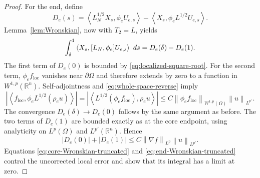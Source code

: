 \documentclass[10pt,a4paper]{amsart}
\newcommand\R{\mathbb{R}}
\newcommand{\abs}[1]{\left\lvert #1\right\rvert}
\newcommand\dd{\,{\rm d}}
\newcommand{\ip}[2]{\left\langle #1,#2\right\rangle}
\newcommand{\norm}[2]{\left\lVert #1\right\rVert_{#2}}
\begin{document}
\begin{proof}
For the end, define
\[
 D_e(s)=\ip{L_N^{1/2}X_s}{\phi_eU_{e,s}}
       -\ip{X_s}{\phi_eL^{1/2}U_{e,s}}.
\]
Lemma~\ref{lem:Wronskian}, now with $T_2=L$, yields
\begin{equation}\label{eq:end-Wronskian-truncated}
 \int_\delta^1\ip{X_s}{[L_N,\phi_e]U_{e,s}}\,\dd s
 =D_e(\delta)-D_e(1).
\end{equation}
The first term of $D_e(0)$ is bounded by
\eqref{eq:localized-square-root}.  For the second term, $\phi_ef_{\mathrm{loc}}$
vanishes near $\partial\Omega$ and therefore extends by zero to a function
in $W^{1,p}(\R^n)$.  Self-adjointness and
\eqref{eq:whole-space-reverse} imply
\[
 \abs{\ip{f_{\mathrm{loc}}}{\phi_eL^{1/2}(\rho_eu)}}
 =\abs{\ip{L^{1/2}(\phi_ef_{\mathrm{loc}})}{\rho_eu}}
 \leq C\norm{\phi_ef_{\mathrm{loc}}}{W^{1,p}(\Omega)}
          \norm u{L^{p'}}.
\]
The convergence $D_e(\delta)\to D_e(0)$ follows by the same argument as
before.  The two terms of $D_e(1)$ are bounded
exactly as at the core endpoint, using
analyticity on $L^p(\Omega)$ and $L^{p'}(\R^n)$.  Hence
\[
 \abs{D_e(0)}+\abs{D_e(1)}
 \leq C\norm{\nabla f}{L^p}\norm u{L^{p'}}.
\]
Equations \eqref{eq:core-Wronskian-truncated} and
\eqref{eq:end-Wronskian-truncated} control the uncorrected local error and
show that its integral has a limit at zero.


\end{proof}
\end{document}
